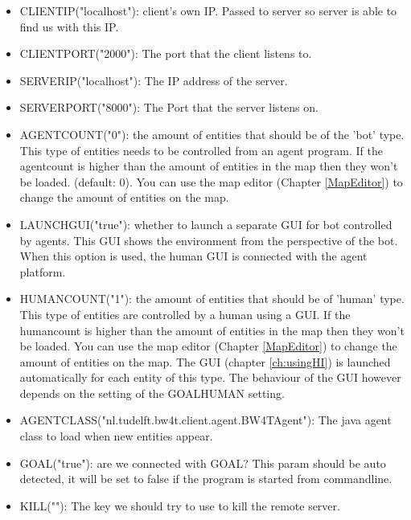 \documentclass[11pt,a4paper]{article}
\begin{document}
\begin{itemize}
\item

    CLIENTIP("localhost"):    client's own IP. Passed to server so server is able to find us with this IP. 

\item
    CLIENTPORT("2000"):   The port that the client listens to. 

\item
    SERVERIP("localhost"):
 The IP address of the server. 
  
\item
    SERVERPORT("8000"):
   The Port that the server listens on. 

\item
    AGENTCOUNT("0"):
 the amount of entities that should be of the 'bot' type. This type of entities needs to be controlled from an agent program. If the agentcount is higher than the amount of entities in the map then they won't be loaded. (default: 0). You can use the map editor (Chapter \ref{MapEditor}) to change the amount of entities on the map. 
    
\item
    LAUNCHGUI("true"):
    whether to launch a separate GUI for bot controlled by agents. This GUI shows the environment from the perspective of the bot. When this option is used, the human GUI is connected with the agent platform. 
        
\item
    HUMANCOUNT("1"):
    the amount of entities that should be of 'human' type. This type of entities are controlled by a human using a GUI. If the humancount is higher than the amount of entities in the map then they won't be loaded. You can use the map editor (Chapter \ref{MapEditor}) to change the amount of entities on the map. The GUI (chapter \ref{ch:usingHI}) is launched automatically for each entity of this type. The behaviour of the GUI however depends on the setting of the GOALHUMAN setting.


\item
    AGENTCLASS("nl.tudelft.bw4t.client.agent.BW4TAgent"):
    The java agent class to load when new entities appear.
   

\item
    GOAL("true"):
    are we connected with GOAL? This param should be auto detected, it will be set to false if the program is started from commandline.

\item
    KILL(""):
  The key we should try to use to kill the remote server.
 

\end{itemize}
\end{document}
